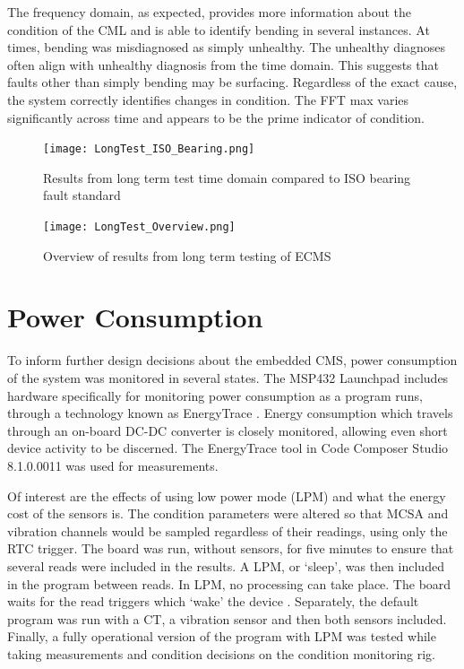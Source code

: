 The frequency domain, as expected, provides more information about the condition of the CML and is able to identify bending in several instances.
At times, bending was misdiagnosed as simply unhealthy.
The unhealthy diagnoses often align with unhealthy diagnosis from the time domain.
This suggests that faults other than simply bending may be surfacing.
Regardless of the exact cause, the system correctly identifies changes in condition.
The FFT max varies significantly across time and appears to be the prime indicator of condition.

\begin{figure}
    \centering
    \texttt{[image: LongTest\_ISO\_Bearing.png]}
    \caption{Results from long term test time domain compared to ISO bearing fault standard}
    \label{fig:LongTest_ISO}
\end{figure}

\begin{landscape}
 \begin{figure}
  \centering
  \texttt{[image: LongTest\_Overview.png]}
  \caption{Overview of results from long term testing of ECMS}
  \label{fig:LongTest_Overview}
 \end{figure}
\end{landscape}

\section{Power Consumption}

To inform further design decisions about the embedded CMS, power consumption of the system was monitored in several states.
The MSP432 Launchpad includes hardware specifically for monitoring power consumption as a program runs, through a technology known as EnergyTrace \cite{EnergyTrace}.
Energy consumption which travels through an on-board DC-DC converter is closely monitored, allowing even short device activity to be discerned.
The EnergyTrace tool in Code Composer Studio 8.1.0.0011 was used for measurements.
\par

Of interest are the effects of using low power mode (LPM) and what the energy cost of the sensors  is.
The condition parameters were altered so that MCSA and vibration channels would be sampled regardless of their readings, using only the RTC trigger.
The board was run, without sensors, for five minutes to ensure that several reads were included in the results.
A LPM, or `sleep', was then included in the program between reads.
In LPM, no processing can take place.
The board waits for the read triggers which `wake' the device \cite{MSP432_Launchpad}.
Separately, the default program was run with a CT, a vibration sensor and then both sensors included.
Finally, a fully operational version of the program with LPM was tested while taking measurements and condition decisions on the condition monitoring rig.
\par

